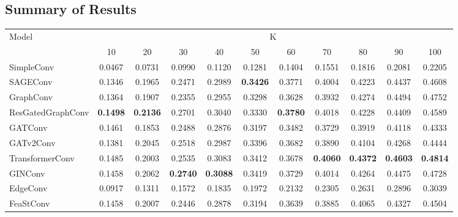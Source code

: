\documentclass{scrartcl}
\begin{document}
\begin{appendices}
\clearpage

\section{Summary of Results}\label{secA3}

\vspace{1cm}

\begin{table}[htbp]
    \hspace{-2.3cm}
    \begin{tabular}{|l|*{10}{c|}}
    \hline
    \multirow{2}{*}{Model} & \multicolumn{10}{c|}{K} \\
    \hhline{~*{10}{|-}|}
                             & 10    & 20    & 30    & 40    & 50    & 60    & 70    & 80    & 90    & 100   \\ \hline
    \rowcolor[gray]{0.9} SimpleConv               & 0.0467 & 0.0731 & 0.0990 & 0.1120 & 0.1281 & 0.1404 & 0.1551 & 0.1816 & 0.2081 & 0.2205 \\ 
    SAGEConv                 & 0.1346 & 0.1965 & 0.2471 & 0.2989 & \textbf{0.3426} & 0.3771 & 0.4004 & 0.4223 & 0.4437 & 0.4608 \\ 
    \rowcolor[gray]{0.9} GraphConv                & 0.1364 & 0.1907 & 0.2355 & 0.2955 & 0.3298 & 0.3628 & 0.3932 & 0.4274 & 0.4494 & 0.4752 \\ 
    ResGatedGraphConv        & \textbf{0.1498} & \textbf{0.2136} & 0.2701 & 0.3040 & 0.3330 & \textbf{0.3780} & 0.4018 & 0.4228 & 0.4409 & 0.4589 \\ 
    \rowcolor[gray]{0.9} GATConv                  & 0.1461 & 0.1853 & 0.2488 & 0.2876 & 0.3197 & 0.3482 & 0.3729 & 0.3919 & 0.4118 & 0.4333 \\ 
    GATv2Conv                & 0.1381 & 0.2045 & 0.2518 & 0.2987 & 0.3396 & 0.3682 & 0.3890 & 0.4104 & 0.4268 & 0.4444 \\ 
    \rowcolor[gray]{0.9} TransformerConv          & 0.1485 & 0.2003 & 0.2535 & 0.3083 & 0.3412 & 0.3678 & \textbf{0.4060} & \textbf{0.4372} & \textbf{0.4603} & \textbf{0.4814} \\ 
    GINConv                  & 0.1458 & 0.2062 & \textbf{0.2740} & \textbf{0.3088} & 0.3419 & 0.3729 & 0.4014 & 0.4264 & 0.4475 & 0.4728 \\ 
    \rowcolor[gray]{0.9} EdgeConv                 & 0.0917 & 0.1311 & 0.1572 & 0.1835 & 0.1972 & 0.2132 & 0.2305 & 0.2631 & 0.2896 & 0.3039 \\ 
    FeaStConv                & 0.1458 & 0.2007 & 0.2446 & 0.2878 & 0.3194 & 0.3639 & 0.3885 & 0.4065 & 0.4327 & 0.4504 \\ 

\end{tabular}
\end{table}
\end{appendices}
\end{document}
